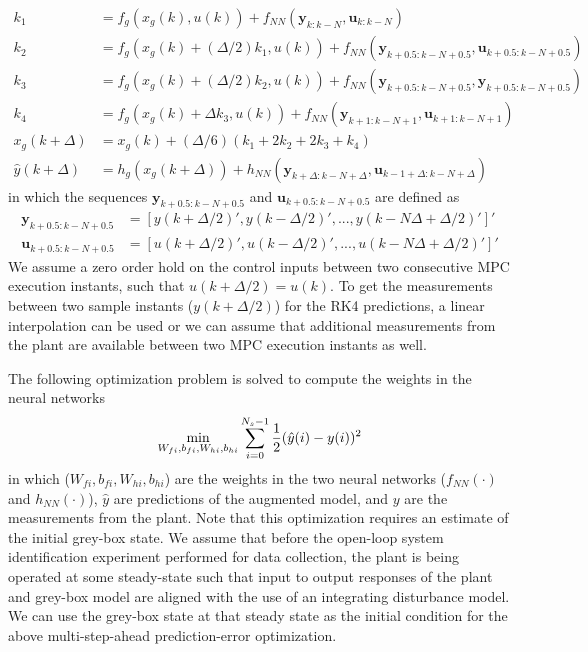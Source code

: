 \documentclass{article}
\begin{document}
\begin{align*}
  k_1 &= f_g(x_g(k), u(k)) + f_{NN}(\mathbf{y}_{k:k-N}, \mathbf{u}_{k:k-N}) \\
  k_2 &= f_g(x_g(k) + (\Delta/2)k_1, u(k)) + 
         f_{NN}(\mathbf{y}_{k+0.5:k-N+0.5}, 
                \mathbf{u}_{k+0.5:k-N+0.5})\\
  k_3 &= f_g(x_g(k) + (\Delta/2)k_2, u(k)) + 
                f_{NN}(\mathbf{y}_{k+0.5:k-N+0.5}, 
                      \mathbf{y}_{k+0.5:k-N+0.5})\\
  k_4 &= f_g(x_g(k) + \Delta k_3, u(k)) + 
                       f_{NN}(\mathbf{y}_{k+1:k-N+1}, 
                              \mathbf{u}_{k+1:k-N+1})\\
  x_g(k+\Delta) &= x_g(k) + (\Delta/6)(k_1 + 2k_2 + 2k_3 + k_4) \\
  \hat{y}(k+\Delta) &= h_g(x_g(k+\Delta)) + h_{NN}(\mathbf{y}_{k+\Delta:k-N+\Delta}, 
                                     \mathbf{u}_{k-1+\Delta:k-N+\Delta})
\end{align*}
in which the sequences $\mathbf{y}_{k+0.5:k-N+0.5}$ 
and $\mathbf{u}_{k+0.5:k-N+0.5}$ are defined as 
\begin{align*}
  \mathbf{y}_{k+0.5:k-N+0.5} &= 
    [y(k + \Delta/2)', y(k-\Delta/2)', ..., y(k-N\Delta + \Delta/2)']' \\
  \mathbf{u}_{k+0.5:k-N+0.5} &= 
  [u(k + \Delta/2)', u(k-\Delta/2)', ..., u(k-N\Delta + \Delta/2)']' 
\end{align*}
We assume a zero order hold on the control inputs between two consecutive 
MPC execution instants, such that $u(k + \Delta/2) = u(k)$. To get the 
measurements between two sample instants ($y(k + \Delta/2)$) for 
the RK4 predictions, a linear interpolation can be used 
or we can assume that additional 
measurements from the plant are available 
between two MPC execution instants as well.

The following optimization problem is solved to compute 
the weights in the neural networks 
\begin{align*}
 \underset{W_{fi}, b_{fi}, W_{hi}, b_{hi}}{\textnormal{min}} \sum_{i=0}^{N_s-1} 
 \dfrac{1}{2}(\hat{y}(i) - y(i))^2
\end{align*}
in which ($W_{fi}, b_{fi}, W_{hi}, b_{hi}$) are the weights in the 
two neural networks ($f_{NN}(\cdot)$ and $h_{NN}(\cdot)$), 
$\hat{y}$ are predictions of the augmented model, and $y$
are the measurements from the plant.
Note that this optimization requires an estimate 
of the initial grey-box state. We assume that 
before the open-loop system identification experiment 
performed for data collection, 
the plant is being operated at some 
steady-state such that input to output
responses of the plant and grey-box model are aligned with 
the use of an integrating disturbance model. We can use 
the grey-box state at that steady state as the initial condition 
for the above multi-step-ahead prediction-error
optimization.
\end{document}
